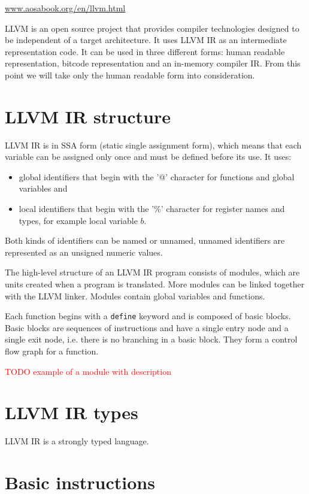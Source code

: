 \url{www.aosabook.org/en/llvm.html}
\medskip

LLVM is an open source project that provides compiler technologies designed to
be independent of a target architecture. It uses LLVM IR as an intermediate
representation code. It can be used in three different forms: human readable
representation, bitcode representation and an in-memory compiler IR. From this
point we will take only the human readable form into consideration.

\section{LLVM IR structure} %

LLVM IR is in SSA form (static single assignment form), which means that each
variable can be assigned only once and must be defined before its use. It uses:

\begin{itemize}
    \item global identifiers that begin with the '@' character for functions
and global variables and
    \item local identifiers that begin with the '\%' character for register
names and types, for example local variable $b$.
\end{itemize}

Both kinds of identifiers can be named or unnamed, unnamed identifiers are
represented as an unsigned numeric values. 

The high-level structure of an LLVM IR program consists of modules, which are
units created when a program is translated. More modules can be linked together
with the LLVM linker. Modules contain global variables and functions.

Each function begins with a \texttt{define} keyword and is composed of basic
blocks. Basic blocks are sequences of instructions and have a single entry node
and a single exit node, i.e. there is no branching in a basic block. They form
a control flow graph for a function. 


\textcolor{red}{TODO example of a module with description}

\section{LLVM IR types}

LLVM IR is a strongly typed language.

\section{Basic instructions}

